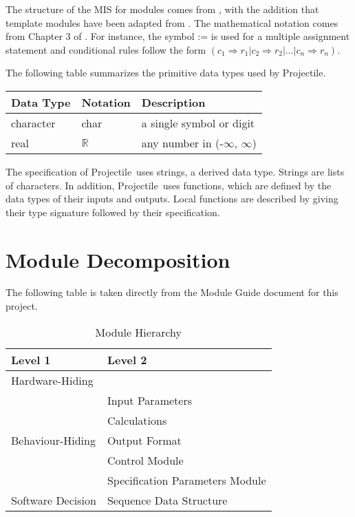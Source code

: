 \documentclass[12pt, titlepage]{article}
\newcommand{\progname}{Projectile}
\begin{document}
The structure of the MIS for modules comes from \citet{HoffmanAndStrooper1995},
with the addition that template modules have been adapted from
\cite{GhezziEtAl2003}.  The mathematical notation comes from Chapter 3 of
\citet{HoffmanAndStrooper1995}.  For instance, the symbol := is used for a
multiple assignment statement and conditional rules follow the form $(c_1
\Rightarrow r_1 | c_2 \Rightarrow r_2 | ... | c_n \Rightarrow r_n )$.

The following table summarizes the primitive data types used by \progname. 

\begin{center}
\renewcommand{\arraystretch}{1.2}
\noindent 
\begin{tabular}{l l p{7.5cm}} 
\toprule 
\textbf{Data Type} & \textbf{Notation} & \textbf{Description}\\ 
\midrule
character & char & a single symbol or digit\\
real & $\mathbb{R}$ & any number in (-$\infty$, $\infty$)\\
\bottomrule
\end{tabular} 
\end{center}

\noindent
The specification of \progname\ uses strings, a derived data type. Strings
are lists of characters. In addition, \progname\ uses functions, which
are defined by the data types of their inputs and outputs. Local functions are
described by giving their type signature followed by their specification.

\newpage
\section{Module Decomposition}

The following table is taken directly from the Module Guide document for this project.

\begin{table}[h!]
\centering
\begin{tabular}{p{} p{}}
\toprule
\textbf{Level 1} & \textbf{Level 2}\\
\midrule

{Hardware-Hiding} & ~ \\
\midrule

\multirow{5}{0.3\textwidth}{Behaviour-Hiding} & Input Parameters\\
& Calculations\\
& Output Format\\
& Control Module\\
& Specification Parameters Module\\
\midrule

\multirow{1}{0.3\textwidth}{Software Decision} & Sequence Data Structure\\
\bottomrule

\end{tabular}
\caption{Module Hierarchy}
\label{TblMH}
\end{table}
\end{document}
